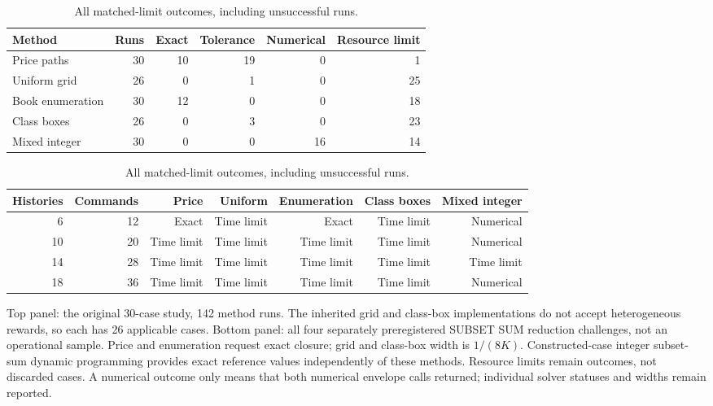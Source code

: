 \begin{table}[p]\centering\small\setlength{\tabcolsep}{3pt}
\caption{All matched-limit outcomes, including unsuccessful runs.}\label{tab:outcomes54}
\begin{tabular}{lrrrrr}\toprule
Method & Runs & Exact & Tolerance & Numerical & Resource limit\\\midrule
Price paths & 30 & 10 & 19 & 0 & 1\\
Uniform grid & 26 & 0 & 1 & 0 & 25\\
Book enumeration & 30 & 12 & 0 & 0 & 18\\
Class boxes & 26 & 0 & 3 & 0 & 23\\
Mixed integer & 30 & 0 & 0 & 16 & 14\\
\bottomrule\end{tabular}\par\medskip
\begin{tabular}{rrrrrrr}\toprule Histories & Commands & Price & Uniform & Enumeration & Class boxes & Mixed integer\\\midrule
6 & 12 & Exact & Time limit & Exact & Time limit & Numerical\\
10 & 20 & Time limit & Time limit & Time limit & Time limit & Numerical\\
14 & 28 & Time limit & Time limit & Time limit & Time limit & Time limit\\
18 & 36 & Time limit & Time limit & Time limit & Time limit & Numerical\\
\bottomrule\end{tabular}
\par\smallskip\begin{minipage}{0.98\textwidth}\small Top panel: the original 30-case study, 142 method runs. The inherited grid and class-box implementations do not accept heterogeneous rewards, so each has 26 applicable cases. Bottom panel: all four separately preregistered SUBSET SUM reduction challenges, not an operational sample. Price and enumeration request exact closure; grid and class-box width is $1/(8K)$. Constructed-case integer subset-sum dynamic programming provides exact reference values independently of these methods. Resource limits remain outcomes, not discarded cases. A numerical outcome only means that both numerical envelope calls returned; individual solver statuses and widths remain reported.\end{minipage}\end{table}\clearpage
